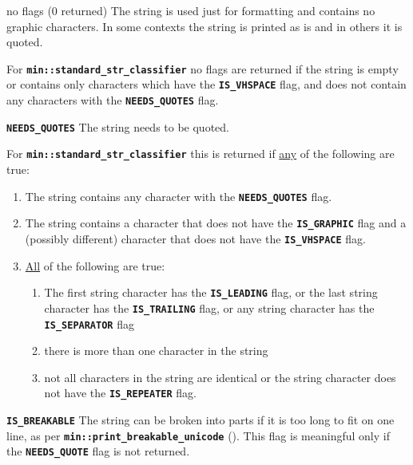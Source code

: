 \documentclass[12pt]{article}
\makeatletter
\newcommand{\TT}[1]{{\tt \bfseries #1}}
\newcommand{\ttmkey}[2]{\TT{#1}\index{#1@{\tt #1}!#2}}
\newcommand{\EOL}{\penalty \exhyphenpenalty}
\newenvironment{itemlist}[1][1.2in]%
	{\begin{list}{}{\setlength{\labelwidth}{#1}%
		        \setlength{\leftmargin}{\labelwidth}%
		        \addtolength{\leftmargin}{+0.2in}%
		        \renewcommand{\makelabel}[1]{##1\hfill}}}%
	{\end{list}}
\makeatother
\begin{document}
\begin{itemlist}[1.5in]

\item[no flags (0 returned)]\label{NO_FLAGS_CLASSIFIER}
The string is used just for formatting and contains no
graphic characters.  In some contexts the string is printed
as is and in others it is quoted.

For \TT{min::\EOL standard\_\EOL str\_\EOL classifier} no flags
are returned if the string is empty or contains only characters
which have the \TT{IS\_\EOL VHSPACE} flag, and does not contain
any characters with the \TT{NEEDS\_\EOL QUOTES} flag.

\item[\ttmkey{NEEDS\_QUOTES}{{\tt min::str\_classifier} flag}]%
\label{NEEDS_QUOTES_CLASSIFIER}
The string needs to be quoted.

For \TT{min::\EOL standard\_\EOL str\_\EOL classifier} this is
returned if \underline{any} of the following are true:
\begin{enumerate}
\item
The string contains any character with the \TT{NEEDS\_\EOL QUOTES} flag.
\item
The string contains a character that does not have the
\TT{IS\_\EOL GRAPHIC} flag and a (possibly different) character that
does not have the \TT{IS\_\EOL VHSPACE} flag.
\item
\underline{All} of the following are true:
\begin{enumerate}
\item The first string character has the \TT{IS\_\EOL LEADING} flag,
or the last string character has the \TT{IS\_\EOL TRAILING} flag,
or any string character has the \TT{IS\_\EOL SEPARATOR} flag
\item there is more than one character in the string
\item not all characters in the string are identical
or the string character does not have the \TT{IS\_\EOL REPEATER} flag.
\end{enumerate}
\end{enumerate}

\item[\ttmkey{IS\_BREAKABLE}{{\tt min::str\_classifier} flag}]%
\label{IS_BREAKABLE_CLASSIFIER}
The string can be broken into parts if it is too long to fit on one line,
as per \TT{min::\EOL print\_\EOL breakable\_\EOL unicode}
(\pageref{MIN::PRINT_BREAKABLE_UNICODE}).  This flag is meaningful
only if the \TT{NEEDS\_\EOL QUOTE} flag is not returned.


\end{itemlist}
\end{document}

